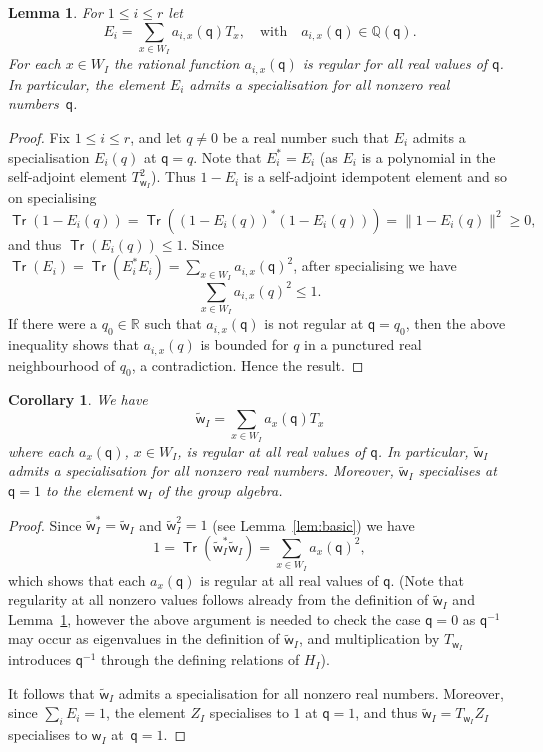 \documentclass[11pt]{article}
\theoremstyle{plain}
\newtheorem{lemma}[thm]{Lemma}
\newtheorem{cor}[thm]{Corollary}
\theoremstyle{definition}
\numberwithin{equation}{section}
\def\tw{\widetilde{\mathsf{w}}_I}
\def\QQ{\mathbb{Q}}
\def\RR{\mathbb{R}}
\DeclareMathOperator\Tr{\mathsf{Tr}}
\newcommand{\sw}{\mathsf{w}}
\newcommand{\sq}{\mathsf{q}}
\begin{document}
\begin{lemma}\label{lem:regular}
For $1\leq i\leq r$ let 
$$
E_i=\sum_{x\in W_I}a_{i,x}(\sq)T_x,\quad\text{with}\quad a_{i,x}(\sq)\in\QQ(\sq). 
$$
For each $x\in W_I$ the rational function $a_{i,x}(\sq)$ is regular for all real values of $\sq$. In particular, the element $E_i$ admits a specialisation for all nonzero real numbers~$\sq$. 
\end{lemma}

\begin{proof}
Fix $1\leq i\leq r$, and let $q\neq 0$ be a real number such that $E_i$ admits a specialisation $E_i(q)$ at $\sq=q$. Note that $E_i^*=E_i$ (as $E_i$ is a polynomial in the self-adjoint element $T_{\sw_I}^2$). Thus $1-E_i$ is a self-adjoint idempotent element and so on specialising
$$
\Tr(1-E_i(q))=\Tr((1-E_i(q))^*(1-E_i(q)))=\|1-E_i(q)\|^2\geq 0,
$$
and thus $\Tr(E_i(q))\leq 1$. Since
$
\Tr(E_i)=\Tr(E_i^*E_i)=\sum_{x\in W_I}a_{i,x}(\sq)^2
$, after specialising we have 
$$
\sum_{x\in W_I}a_{i,x}(q)^2\leq 1. 
$$
If there were a $q_0\in\RR$ such that $a_{i,x}(\sq)$ is not regular at $\sq=q_0$, then the above inequality shows that $a_{i,x}(q)$ is bounded for $q$ in a punctured real neighbourhood of $q_0$, a contradiction. Hence the result. 
\end{proof}



\begin{cor}\label{cor:specialise}
We have 
$$
\tw=\sum_{x\in W_I}a_x(\sq)T_x
$$
where each $a_x(\sq)$, $x\in W_I$, is regular at all real values of $\sq$. In particular, $\tw$ admits a specialisation for all nonzero real numbers. Moreover, $\tw$ specialises at $\sq=1$ to the element $\sw_I$ of the group algebra. 
\end{cor}



\begin{proof}
Since $\tw^*=\tw$ and $\tw^2=1$ (see Lemma~\ref{lem:basic}) we have 
$$
1=\Tr(\tw^*\tw)=\sum_{x\in W_I}a_x(\sq)^2,
$$
which shows that each $a_x(\sq)$ is regular at all real values of $\sq$. (Note that regularity at all nonzero values follows already from the definition of $\tw$ and Lemma~\ref{lem:regular}, however the above argument is needed to check the case $\sq=0$ as $\sq^{-1}$ may occur as eigenvalues in the definition of $\tw$, and multiplication by $T_{\sw_I}$ introduces $\sq^{-1}$ through the defining relations of $H_I$). 

It follows that $\tw$ admits a specialisation for all nonzero real numbers. Moreover, since $\sum_i E_i=1$, the element $Z_I$ specialises to $1$ at $\sq=1$, and thus $\tw=T_{\sw_I}Z_I$ specialises to $\sw_I$ at~$\sq=1$.
\end{proof} 
\end{document}
